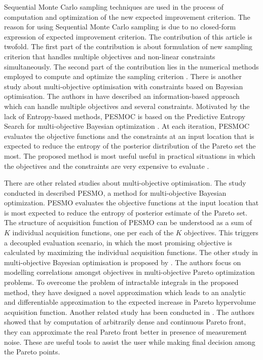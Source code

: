 Sequential Monte Carlo sampling techniques are used in the process of computation and optimization of the new expected improvement criterion. The reason for using Sequential Monte Carlo sampling  is due to no closed-form expression of expected improvement criterion.
The contribution of this article is twofold. The first part of the contribution is about formulation of new sampling criterion that handles multiple objectives and non-linear constraints simultaneously.  The second part of the contribution lies in the numerical methods employed to compute and optimize the sampling criterion \cite{feliot2017bayesian}. 
There is another study about multi-objective optimisation with constraints based on Bayesian optimisation. The authors in \cite{garrido2016predictive} have described an information-based approach which can handle multiple objectives and several constraints. Motivated by the lack of Entropy-based methods, PESMOC is based on the Predictive Entropy Search for multi-objective Bayesian optimization \cite{hernandez2016predictive}. At each iteration, PESMOC evaluates the objective functions and the constraints at an input location that is expected to reduce the entropy of the posterior distribution of the Pareto set the most. The proposed method is most useful useful in practical situations in which the objectives and the constraints are very
expensive to evaluate \cite{garrido2016predictive}.
\par
There are other related studies about multi-objective optimisation. The study conducted in \cite{hernandez2016predictive} described PESMO, a method for multi-objective Bayesian optimization. PESMO evaluates the objective functions at the input location that is most expected to reduce the entropy of posterior estimate of the Pareto set. The structure of acquisition function of PESMO can be understood as a sum of $K$ individual acquisition functions, one per each of the $K$ objectives. This triggers a decoupled evaluation scenario, in which the most promising objective is calculated by maximizing the individual acquisition functions.
The other study in multi-objective Bayesian optimisation is proposed by \cite{shah2016pareto}. The authors focus on modelling correlations amongst
objectives in multi-objective Pareto optimization problems. To overcome the problem of intractable integrals in the proposed method, they have designed a novel approximation which leads to an analytic and differentiable approximation to the expected increase in Pareto hypervolume acquisition function.
Another related study has been conducted in \cite{calandra2014pareto}. The authors showed that by computation of arbitrarily dense and continuous Pareto front, they can approximate the real Pareto front better in presence of measurement noise. These are useful tools to assist the user while making final decision among the Pareto points.
